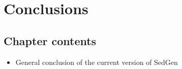 \chapter{Conclusions}\label{ch:conclusion}

\section{Chapter contents}
\begin{itemize}
    \item General conclusion of the current version of SedGen
\end{itemize}

\instructionsconclusions


\cleardoublepage

